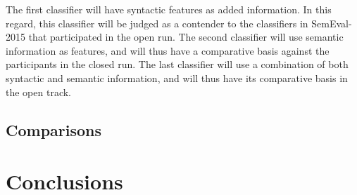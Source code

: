 The first classifier will have syntactic features as added information. In this regard, this classifier will be judged as a contender to the classifiers in SemEval-2015 that participated in the open run. The second classifier will use semantic information as features, and will thus have a comparative basis against the participants in the closed run. The last classifier will use a combination of both syntactic and semantic information, and will thus have its comparative basis in the open track.

\subsection{Comparisons}
\label{comparisons}

\section{Conclusions}
